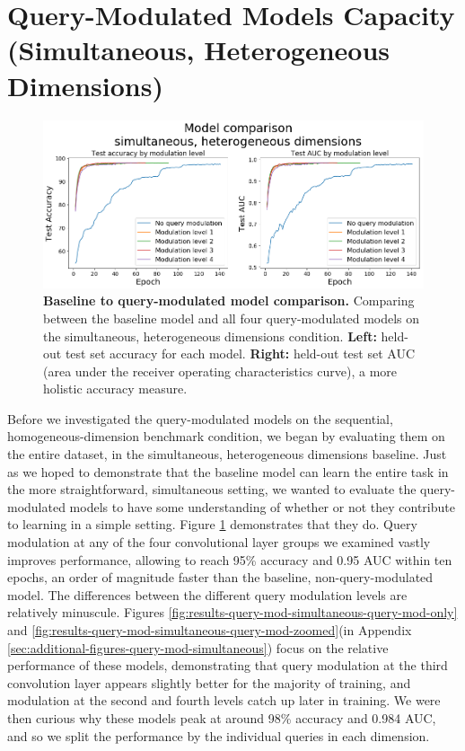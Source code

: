 \FloatBarrier
\section{Query-Modulated Models Capacity (Simultaneous, Heterogeneous Dimensions)\label{res:query-mod-baseline}}

\begin{figure}[!htb]
\centering
\includegraphics[width=\linewidth]{ch-results/figures/query_mod_simultaneous/baseline_comparison.png}
\caption{ {\bf Baseline to query-modulated model comparison.} Comparing between the baseline model and all four query-modulated models on the simultaneous, heterogeneous dimensions condition. \textbf{Left:} held-out test set accuracy for each model. \textbf{Right:} held-out test set AUC (area under the receiver operating characteristics curve), a more holistic accuracy measure.}
\label{fig:results-query-mod-simultaneous-baseline-comparison}
\end{figure}

Before we investigated the query-modulated models on the sequential, homogeneous-dimension benchmark condition, we began by evaluating them on the entire dataset, in the simultaneous, heterogeneous dimensions baseline. Just as we hoped to demonstrate that the baseline model can learn the entire task in the more straightforward, simultaneous setting, we wanted to evaluate the query-modulated models to have some understanding of whether or not they contribute to learning in a simple setting. Figure \ref{fig:results-query-mod-simultaneous-baseline-comparison} demonstrates that they do. Query modulation at any of the four convolutional layer groups we examined vastly improves performance, allowing to reach 95\% accuracy and 0.95 AUC within ten epochs, an order of magnitude faster than the baseline, non-query-modulated model. The differences between the different query modulation levels are relatively minuscule. Figures \ref{fig:results-query-mod-simultaneous-query-mod-only} and \ref{fig:results-query-mod-simultaneous-query-mod-zoomed}(in Appendix \ref{sec:additional-figures-query-mod-simultaneous}) focus on the relative performance of these models, demonstrating that query modulation at the third convolution layer appears slightly better for the majority of training, and modulation at the second and fourth levels catch up later in training. We were then curious why these models peak at around 98\% accuracy and 0.984 AUC, and so we split the performance by the individual queries in each dimension.

